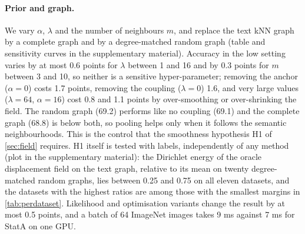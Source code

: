 \paragraph{Prior and graph.}
We vary $\alpha$, $\lambda$ and the number of neighbours $m$, and replace the text kNN graph by a complete graph and by a degree-matched random graph (table and sensitivity curves in the supplementary material). Accuracy in the low setting varies by at most 0.6 points for $\lambda$ between 1 and 16 and by 0.3 points for $m$ between 3 and 10, so neither is a sensitive hyper-parameter; removing the anchor ($\alpha=0$) costs 1.7 points, removing the coupling ($\lambda=0$) 1.6, and very large values ($\lambda=64$, $\alpha=16$) cost 0.8 and 1.1 points by over-smoothing or over-shrinking the field. The random graph (69.2) performs like no coupling (69.1) and the complete graph (68.8) is below both, so pooling helps only when it follows the semantic neighbourhoods. This is the control that the smoothness hypothesis H1 of \cref{sec:field} requires. H1 itself is tested with labels, independently of any method (plot in the supplementary material): the Dirichlet energy of the oracle displacement field on the text graph, relative to its mean on twenty degree-matched random graphs, lies between 0.25 and 0.75 on all eleven datasets, and the datasets with the highest ratios are among those with the smallest margins in \cref{tab:perdataset}. Likelihood and optimisation variants change the result by at most 0.5 points, and a batch of 64 ImageNet images takes 9 ms against 7 ms for StatA on one GPU.
